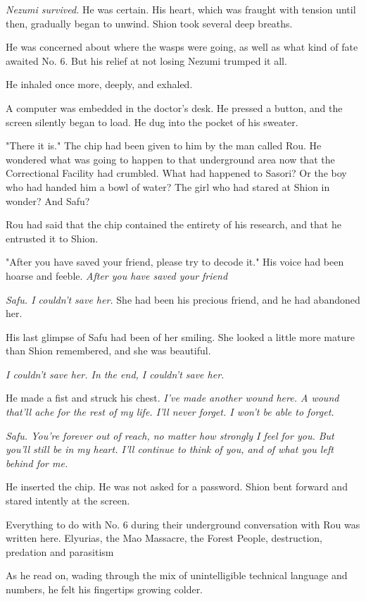 \emph{Nezumi survived.} He was certain. His heart, which was fraught with
tension until then, gradually began to unwind. Shion took several deep
breaths.

He was concerned about where the wasps were going, as well as what kind
of fate awaited No. 6. But his relief at not losing Nezumi trumped it
all.

He inhaled once more, deeply, and exhaled.

A computer was embedded in the doctor's desk. He pressed a button, and
the screen silently began to load. He dug into the pocket of his
sweater.

"There it is." The chip had been given to him by the man called Rou. He
wondered what was going to happen to that underground area now that the
Correctional Facility had crumbled. What had happened to Sasori? Or the
boy who had handed him a bowl of water? The girl who had stared at Shion
in wonder? And Safu?

Rou had said that the chip contained the entirety of his research, and
that he entrusted it to Shion.

"After you have saved your friend, please try to decode it." His voice
had been hoarse and feeble. \emph{After you have saved your friend\el }

\emph{Safu. I couldn't save her.} She had been his precious friend, and he had
abandoned her.

His last glimpse of Safu had been of her smiling. She looked a little
more mature than Shion remembered, and she was beautiful.

\emph{I couldn't save her. In the end, I couldn't save her.}

He made a fist and struck his chest. \emph{I've made another wound here. A
wound that'll ache for the rest of my life. I'll never forget. I won't
be able to forget.}

\emph{Safu. You're forever out of reach, no matter how strongly I feel for
you. But you'll still be in my heart. I'll continue to think of you, and
of what you left behind for me.}

He inserted the chip. He was not asked for a password. Shion bent
forward and stared intently at the screen.

Everything to do with No. 6 during their underground conversation with
Rou was written here. Elyurias, the Mao Massacre, the Forest People,
destruction, predation and parasitism\el 

As he read on, wading through the mix of unintelligible technical
language and numbers, he felt his fingertips growing colder.

